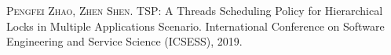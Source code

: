 
\begin{publications}{99}
    \item\textsc{Pengfei Zhao, Zhen Shen}. TSP: A Threads Scheduling Policy for Hierarchical Locks in Multiple Applications Scenario. International Conference on Software Engineering and Service Science (ICSESS), 2019.
\end{publications}
